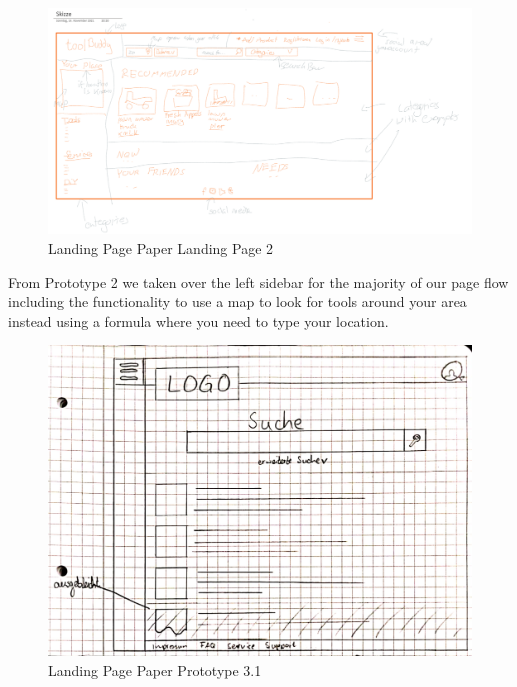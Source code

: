 			
			 \begin{figure}[H]
				\centering
				\includegraphics[width=\linewidth]{abb/6_Sketching and Paper Prototyping/Homepage2.png}
				\caption{Landing Page Paper Landing Page 2}
				\label{fig:Homepage2}
			\end{figure}
			
			\noindent
			From Prototype 2 we taken over the left sidebar for the majority of our page flow including the functionality to use a map to look for tools around your area instead using a formula where you need to type your location.
			
			\begin{figure}[H]
				\centering
				\includegraphics[width=\linewidth]{abb/6_Sketching and Paper Prototyping/Homepage3.png}
				\caption{Landing Page Paper Prototype 3.1}
				\label{fig:Homepage3}
			\end{figure}
			
